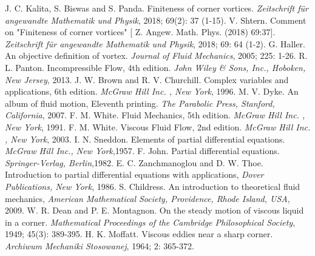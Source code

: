 \begin{thebibliography}{160}
 J. C. Kalita, S. Biswas and S. Panda. {Finiteness of corner vortices.}  {\em Zeitschrift f\"{u}r angewandte Mathematik und Physik}, 2018; 69(2): 37 (1-15).
 V. Shtern. {Comment on "Finiteness of corner vortices"}  [ Z. Angew. Math. Phys. (2018) 69:37].  {\em Zeitschrift f\"{u}r angewandte Mathematik und Physik}, 2018; 69: 64 (1-2). 
 G. Haller. {An objective definition of vortex.} {\em Journal of Fluid Mechanics}, 2005; 225: 1-26.
 R. L. Panton. Incompressible Flow, 4th edition. {\em John Wiley \& Sons, Inc., Hoboken, New Jersey}, 2013.
 J. W. Brown and R. V. Churchill. Complex variables and applications, 6th edition. {\em McGraw Hill Inc. , New York}, 1996.
 M. V. Dyke. An album of fluid motion, Eleventh printing. {\em The Parabolic Press, Stanford, California}, 2007.
 F. M. White. Fluid Mechanics, 5th edition. {\em McGraw Hill Inc. , New York}, 1991.
 F. M. White. Viscous Fluid Flow, 2nd edition. {\em McGraw Hill Inc. , New York}, 2003.
 I. N. Sneddon. Elements of partial differential equations. {\em McGraw Hill Inc., New York},1957.
 F. John. Partial differential equations. {\em Springer-Verlag, Berlin},1982.
 E. C. Zanchmanoglou and D. W. Thoe. Introduction to partial differential equations with applications, {\em Dover Publications, New York}, 1986.
 S. Childress.  An introduction to theoretical fluid mechanics, {\em American Mathematical Society, Providence, Rhode Island, USA}, 2009.
 W. R. Dean and P. E. Montagnon. On the steady motion of viscous liquid in a corner. {\em Mathematical Proceedings of the Cambridge Philosophical Society}, 1949; 45(3): 389-395.
 H. K. Moffatt. Viscous eddies near a sharp corner. {\em Archiwum Mechaniki Stosowanej}, 1964; 2: 365-372.

\end{thebibliography}
